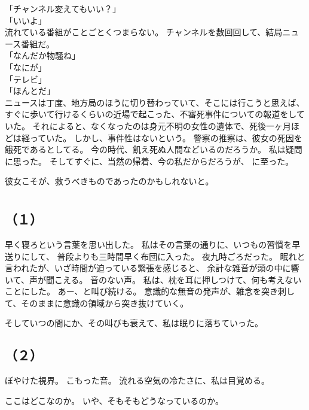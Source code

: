 \documentclass[../IHMain]{subfiles}
\begin{document}
「チャンネル変えてもいい？」\\
「いいよ」\\
流れている番組がことごとくつまらない。
チャンネルを数回回して、結局ニュース番組だ。\\
「なんだか物騒ね」\\
「なにが」\\
「テレビ」\\
「ほんとだ」\\
ニュースは丁度、地方局のほうに切り替わっていて、そこには行こうと思えば、
すぐに歩いて行けるくらいの近場で起こった、不審死事件についての報道をしていた。
それによると、なくなったのは身元不明の女性の遺体で、死後一ヶ月ほどは経っていた。
しかし、事件性はないという。
警察の推察は、彼女の死因を餓死であるとしてる。
今の時代、飢え死ぬ人間などいるのだろうか。
私は疑問に思った。
そしてすぐに、当然の帰着、今の私だからだろうが、
に至った。

彼女こそが、救うべきものであったのかもしれないと。

\section{}
\subsection*{（１）}
早く寝ろという言葉を思い出した。
私はその言葉の通りに、いつもの習慣を早送りにして、
普段よりも三時間早く布団に入った。
夜九時ごろだった。
眠れと言われたが、いざ時間が迫っている緊張を感じると、
余計な雑音が頭の中に響いて、声が聞こえる。
音のない声。
私は、枕を耳に押しつけて、何も考えないことにした。
あー、と叫び続ける。
意識的な無音の発声が、雑念を突き刺して、そのままに意識の領域から突き抜けていく。

そしていつの間にか、その叫びも衰えて、私は眠りに落ちていった。

\subsection*{（２）}
ぼやけた視界。
こもった音。
流れる空気の冷たさに、私は目覚める。

ここはどこなのか。
いや、そもそもどうなっているのか。
\end{document}
